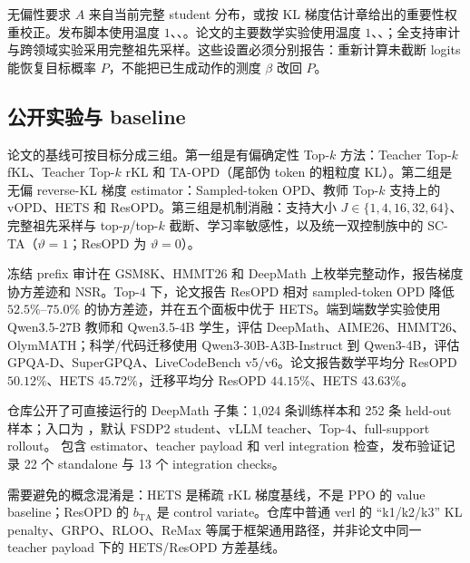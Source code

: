 无偏性要求 $A$ 来自当前完整 student 分布，或按 KL 梯度估计章给出的重要性权重校正。发布脚本使用温度 $1$、、。论文的主要数学实验使用温度 $1$、、；全支持审计与跨领域实验采用完整祖先采样。这些设置必须分别报告：重新计算未截断 logits 能恢复目标概率 $P$，不能把已生成动作的测度 $\beta$ 改回 $P$。

\subsection{公开实验与 baseline}

论文的基线可按目标分成三组。第一组是有偏确定性 Top-$k$ 方法：Teacher Top-$k$ fKL、Teacher Top-$k$ rKL 和 TA-OPD（尾部伪 token 的粗粒度 KL）。第二组是无偏 reverse-KL 梯度 estimator：Sampled-token OPD、教师 Top-$k$ 支持上的 vOPD、HETS 和 ResOPD。第三组是机制消融：支持大小 $J\in\{1,4,16,32,64\}$、完整祖先采样与 top-$p$/top-$k$ 截断、学习率敏感性，以及统一双控制族中的 SC-TA（$\vartheta=1$；ResOPD 为 $\vartheta=0$）。

冻结 prefix 审计在 GSM8K、HMMT26 和 DeepMath 上枚举完整动作，报告梯度协方差迹和 NSR。Top-$4$ 下，论文报告 ResOPD 相对 sampled-token OPD 降低 $52.5\%$--$75.0\%$ 的协方差迹，并在五个面板中优于 HETS。端到端数学实验使用 Qwen3.5-27B 教师和 Qwen3.5-4B 学生，评估 DeepMath、AIME26、HMMT26、OlymMATH；科学/代码迁移使用 Qwen3-30B-A3B-Instruct 到 Qwen3-4B，评估 GPQA-D、SuperGPQA、LiveCodeBench v5/v6。论文报告数学平均分 ResOPD $50.12\%$、HETS $45.72\%$，迁移平均分 ResOPD $44.15\%$、HETS $43.63\%$。

仓库公开了可直接运行的 DeepMath 子集：1,024 条训练样本和 252 条 held-out 样本；入口为 ，默认 FSDP2 student、vLLM teacher、Top-$4$、full-support rollout。 包含 estimator、teacher payload 和 verl integration 检查，发布验证记录 22 个 standalone 与 13 个 integration checks。

需要避免的概念混淆是：HETS 是稀疏 rKL 梯度基线，不是 PPO 的 value baseline；ResOPD 的 $b_{\mathrm{TA}}$ 是 control variate。仓库中普通 verl 的 ``k1/k2/k3'' KL penalty、GRPO、RLOO、ReMax 等属于框架通用路径，并非论文中同一 teacher payload 下的 HETS/ResOPD 方差基线。

